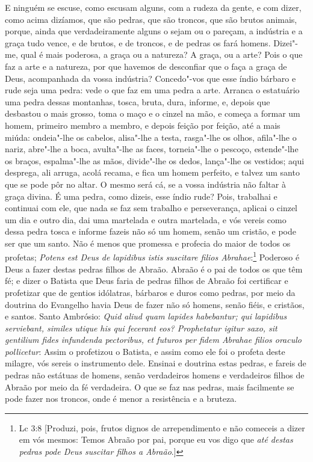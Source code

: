 E ninguém se escuse, como escusam alguns, com a rudeza da gente, e
com dizer, como acima dizíamos, que são pedras, que são troncos, que são
brutos animais, porque, ainda que verdadeiramente alguns o sejam ou o
pareçam, a indústria e a graça tudo vence, e de brutos, e de troncos, e
de pedras os fará homens. Dizei"-me, qual é mais poderosa, a graça ou a
natureza? A graça, ou a arte? Pois o que faz a arte e a natureza, por
que havemos de desconfiar que o faça a graça de Deus, acompanhada da
vossa indústria? Concedo"-vos que esse índio bárbaro e rude seja uma
pedra: vede o que faz em uma pedra a arte. Arranca o estatuário uma
pedra dessas montanhas, tosca, bruta, dura, informe, e, depois que
desbastou o mais grosso, toma o maço e o cinzel na mão, e começa a
formar um homem, primeiro membro a membro, e depois feição por feição,
até a mais miúda: ondeia"-lhe os cabelos, alisa"-lhe a testa, rasga"-lhe os
olhos, afila"-lhe o nariz, abre"-lhe a boca, avulta"-lhe as faces,
torneia"-lhe o pescoço, estende"-lhe os braços, espalma"-lhe as mãos,
divide"-lhe os dedos, lança"-lhe os vestidos; aqui desprega, ali arruga,
acolá recama, e fica um homem perfeito, e talvez um santo que se pode
pôr no altar. O mesmo será cá, se a vossa indústria não faltar à graça
divina. É uma pedra, como dizeis, esse índio rude? Pois, trabalhai e
continuai com ele, que nada se faz sem trabalho e perseverança,
aplicai o cinzel um dia e outro dia, dai uma martelada e outra
martelada, e vós vereis como dessa pedra tosca e informe fazeis não só
um homem, senão um cristão, e pode ser que um santo.
Não é menos que promessa e profecia do maior de todos os profetas;
\emph{Potens est Deus de lapidibus istis suscitare filios Abrahae}:\footnote{Lc 3:8 [Produzi, pois, frutos dignos de arrependimento e não comeceis a dizer em vós mesmos:
Temos Abraão por pai, porque eu vos digo que \emph{até destas pedras pode Deus suscitar filhos a Abraão}.]}
Poderoso é Deus a fazer destas pedras filhos de Abraão.
Abraão é o pai de todos os que têm fé; e dizer o Batista que Deus faria
de pedras filhos de Abraão foi certificar e profetizar que de gentios
idólatras, bárbaros e duros como pedras, por meio da doutrina do
Evangelho havia Deus de fazer não só homens, senão fiéis, e cristãos, e
santos. Santo Ambrósio: \emph{Quid aliud quam lapides habebantur; qui
lapidibus serviebant, similes utique his qui fecerant eos? Prophetatur
igitur saxo, sit gentilium fides infundenda pectoribus, et futuros per
fidem Abrahae filios oraculo pollicetur}: Assim o profetizou o
Batista, e assim como ele foi o profeta
deste milagre, vós sereis o instrumento dele. Ensinai e doutrina estas
pedras, e fareis de pedras não estátuas de homens, senão verdadeiros
homens e verdadeiros filhos de Abraão por meio da fé verdadeira. O que
se faz nas pedras, mais facilmente se pode fazer nos troncos, onde é
menor a resistência e a bruteza.

